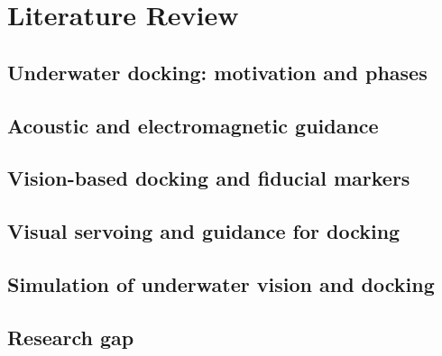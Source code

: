 \section{Literature Review}


\subsection{Underwater docking: motivation and phases}

\subsection{Acoustic and electromagnetic guidance}

\subsection{Vision-based docking and fiducial markers}

\subsection{Visual servoing and guidance for docking}

\subsection{Simulation of underwater vision and docking}

\subsection{Research gap}
